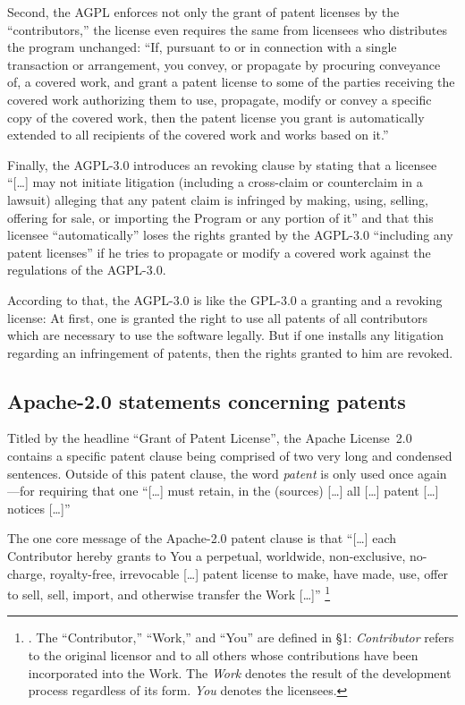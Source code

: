 Second, the AGPL enforces not only the grant of patent licenses by the
\enquote{contributors,} the license even requires the same from licensees who
distributes the program unchanged: \enquote{If, pursuant to or in connection
with a single transaction or arrangement, you convey, or propagate by procuring
conveyance of, a covered work, and grant a patent license to some of the parties
receiving the covered work authorizing them to use, propagate, modify or convey
a specific copy of the covered work, then the patent license you grant is
automatically extended to all recipients of the covered work and works based on
it.}

Finally, the AGPL-3.0 introduces an revoking clause by stating that a licensee
\enquote{[\ldots] may not initiate litigation (including a cross-claim or
counterclaim in a lawsuit) alleging that any patent claim is infringed by
making, using, selling, offering for sale, or importing the Program or any
portion of it} and that this licensee \enquote{automatically}
loses the rights granted by the AGPL-3.0 \enquote{including any patent
licenses} if he tries to propagate or modify a covered work against the
regulations of the AGPL-3.0. 

According to that, the AGPL-3.0 is like the GPL-3.0 a granting and a revoking
license: At first, one is granted the right to use all patents of all
contributors which are necessary to use the software legally. But if one
installs any litigation regarding an infringement of patents, then the rights
granted to him are revoked.


\subsection{Apache-2.0 statements concerning patents}

Titled by the headline \enquote{Grant of Patent License}, the Apache License~2.0
contains a specific patent clause being comprised of two very long and condensed
sentences. Outside of this patent clause, the word \emph{patent} is
only used once again---for requiring that one \enquote{[\ldots] must retain, in
the (sources) [\ldots] all [\ldots] patent [\ldots] notices [\ldots]}

The one core message of the Apache-2.0 patent clause is that
\enquote{[\ldots] each Contributor hereby grants to You a perpetual, worldwide,
non-exclusive, no-charge, royalty-free, irrevocable [\ldots] patent license to
make, have made, use, offer to sell, sell, import, and otherwise transfer the
Work [\ldots]}%
  \footnote{\cite[cf.][\nopage wp §3]{Apl20OsiLicense2004a}. The
  \enquote{Contributor,} \enquote{Work,} and \enquote{You} are defined in §1:
  \emph{Contributor} refers to the original licensor and to all others whose
  contributions have been incorporated into the Work. The \emph{Work} denotes
  the result of the development process regardless of its form. \emph{You}
  denotes the licensees.}


